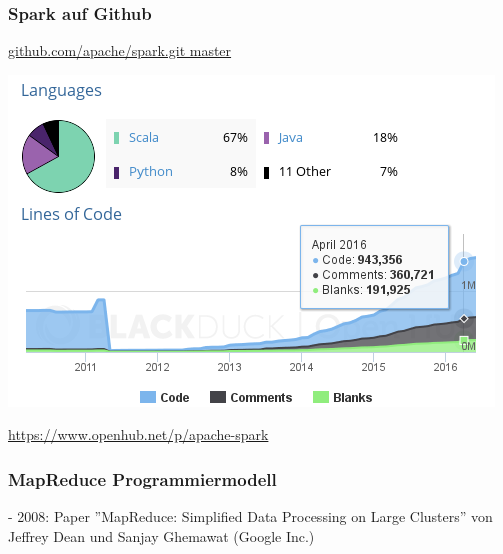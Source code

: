 \begin{frame}
    \frametitle{Spark auf Github}
    \url{github.com/apache/spark.git master}\\
    \centerline{\includegraphics[width=0.9\linewidth]{spark-openhub.png}}
    \textcolor{gray}{\scriptsize{\url{
        https://www.openhub.net/p/apache-spark
    }}}
\end{frame}


\begin{frame}
    \frametitle{MapReduce Programmiermodell}
    - 2008: Paper ''MapReduce: Simplified Data Processing on Large Clusters'' von Jeffrey Dean und Sanjay Ghemawat (Google Inc.)
\end{frame}


